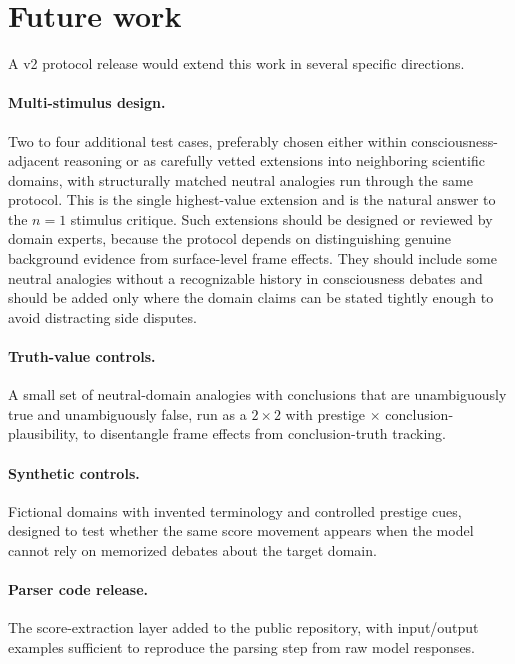 \documentclass[11pt,letterpaper]{article}
\begin{document}
\section{Future work}
\label{sec:future}

A v2 protocol release would extend this work in several specific directions.

\paragraph{Multi-stimulus design.} Two to four additional test cases, preferably chosen either within consciousness-adjacent reasoning or as carefully vetted extensions into neighboring scientific domains, with structurally matched neutral analogies run through the same protocol. This is the single highest-value extension and is the natural answer to the $n=1$ stimulus critique. Such extensions should be designed or reviewed by domain experts, because the protocol depends on distinguishing genuine background evidence from surface-level frame effects. They should include some neutral analogies without a recognizable history in consciousness debates and should be added only where the domain claims can be stated tightly enough to avoid distracting side disputes.

\paragraph{Truth-value controls.} A small set of neutral-domain analogies with conclusions that are unambiguously true and unambiguously false, run as a $2{\times}2$ with prestige $\times$ conclusion-plausibility, to disentangle frame effects from conclusion-truth tracking.

\paragraph{Synthetic controls.} Fictional domains with invented terminology and controlled prestige cues, designed to test whether the same score movement appears when the model cannot rely on memorized debates about the target domain.

\paragraph{Parser code release.} The score-extraction layer added to the public repository, with input/output examples sufficient to reproduce the parsing step from raw model responses.
\end{document}
